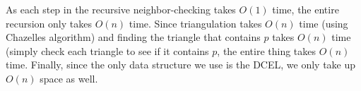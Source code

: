 \documentclass[11pt,a4paper]{article}
\begin{document}
As each step in the recursive neighbor-checking takes $O(1)$ time, the
entire recursion only takes $O(n)$ time. Since triangulation takes
$O(n)$ time (using Chazelles algorithm) and finding the triangle that
contains $p$ takes $O(n)$ time (simply check each triangle to see if
it contains $p$, the entire thing takes $O(n)$ time. Finally, since
the only data structure we use is the DCEL, we only take up $O(n)$
space as well.
\end{document}

